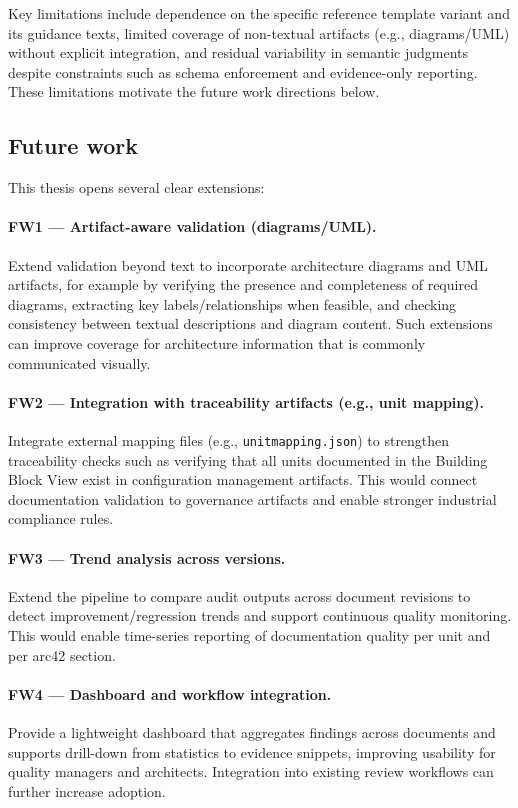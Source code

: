 Key limitations include dependence on the specific reference template variant and its guidance texts, limited coverage of non-textual artifacts (e.g., diagrams/UML) without explicit integration, and residual variability in semantic judgments despite constraints such as schema enforcement and evidence-only reporting. These limitations motivate the future work directions below.

\subsection{Future work}
\label{sec:conclusion_future_work}

This thesis opens several clear extensions:

\paragraph{FW1 --- Artifact-aware validation (diagrams/UML).}
Extend validation beyond text to incorporate architecture diagrams and UML artifacts, for example by verifying the presence and completeness of required diagrams, extracting key labels/relationships when feasible, and checking consistency between textual descriptions and diagram content. Such extensions can improve coverage for architecture information that is commonly communicated visually.

\paragraph{FW2 --- Integration with traceability artifacts (e.g., unit mapping).}
Integrate external mapping files (e.g., \texttt{unitmapping.json}) to strengthen traceability checks such as verifying that all units documented in the Building Block View exist in configuration management artifacts. This would connect documentation validation to governance artifacts and enable stronger industrial compliance rules.

\paragraph{FW3 --- Trend analysis across versions.}
Extend the pipeline to compare audit outputs across document revisions to detect improvement/regression trends and support continuous quality monitoring. This would enable time-series reporting of documentation quality per unit and per arc42 section.

\paragraph{FW4 --- Dashboard and workflow integration.}
Provide a lightweight dashboard that aggregates findings across documents and supports drill-down from statistics to evidence snippets, improving usability for quality managers and architects. Integration into existing review workflows can further increase adoption.

